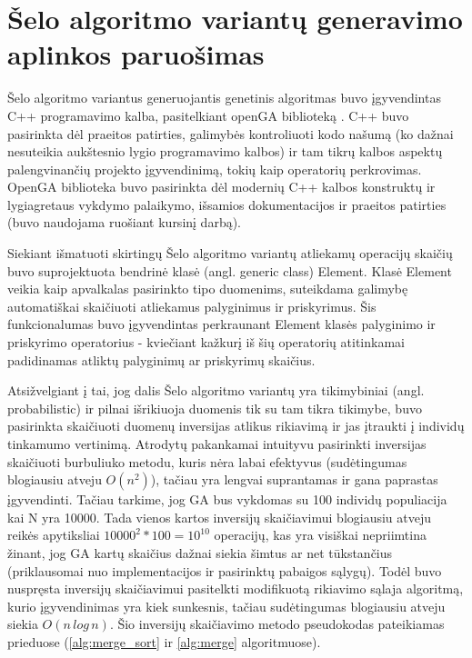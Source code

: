 \documentclass{VUMIFInfKursinis}
\begin{document}
\section{Šelo algoritmo variantų generavimo aplinkos paruošimas}

Šelo algoritmo variantus generuojantis genetinis algoritmas buvo įgyvendintas C++ programavimo kalba, pasitelkiant openGA biblioteką \cite{mohammadi2017openga}.
C++ buvo pasirinkta dėl praeitos patirties, galimybės kontroliuoti kodo našumą (ko dažnai nesuteikia aukštesnio lygio programavimo kalbos)
ir tam tikrų kalbos aspektų palengvinančių projekto įgyvendinimą, tokių kaip operatorių perkrovimas.
OpenGA biblioteka buvo pasirinkta dėl modernių C++ kalbos konstruktų ir lygiagretaus vykdymo palaikymo, išsamios dokumentacijos ir praeitos patirties (buvo naudojama ruošiant kursinį darbą).

Siekiant išmatuoti skirtingų Šelo algoritmo variantų atliekamų operacijų skaičių buvo
suprojektuota bendrinė klasė (angl. generic class) Element.
Klasė Element veikia kaip apvalkalas pasirinkto tipo duomenims, suteikdama
galimybę automatiškai skaičiuoti atliekamus palyginimus ir priskyrimus.
Šis funkcionalumas buvo įgyvendintas perkraunant Element klasės palyginimo ir priskyrimo operatorius - kviečiant
kažkurį iš šių operatorių atitinkamai padidinamas atliktų palyginimų ar priskyrimų skaičius.

Atsižvelgiant į tai, jog dalis Šelo algoritmo variantų yra tikimybiniai (angl. probabilistic) ir pilnai išrikiuoja duomenis tik su tam tikra tikimybe,
buvo pasirinkta skaičiuoti duomenų inversijas atlikus rikiavimą ir jas įtraukti į individų tinkamumo vertinimą.
Atrodytų pakankamai intuityvu pasirinkti inversijas skaičiuoti burbuliuko metodu, kuris nėra labai efektyvus (sudėtingumas blogiausiu atveju $O(n^2)$),
tačiau yra lengvai suprantamas ir gana paprastas įgyvendinti.
Tačiau tarkime, jog GA bus vykdomas su 100 individų populiacija kai N yra 10000.
Tada vienos kartos inversijų skaičiavimui blogiausiu atveju reikės apytiksliai $10000^2 * 100 = 10^{10}$ operacijų, kas yra visiškai nepriimtina žinant,
jog GA kartų skaičius dažnai siekia šimtus ar net tūkstančius (priklausomai nuo implementacijos ir pasirinktų pabaigos sąlygų).
Todėl buvo nuspręsta inversijų skaičiavimui pasitelkti modifikuotą rikiavimo sąlaja algoritmą, kurio įgyvendinimas yra kiek sunkesnis, tačiau sudėtingumas blogiausiu atveju siekia $O(n\,log\,n)$.
Šio inversijų skaičiavimo metodo pseudokodas pateikiamas prieduose (\ref{alg:merge_sort} ir \ref{alg:merge} algoritmuose).
\end{document}
